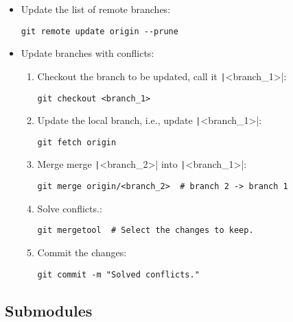 \begin{itemize}
    \item Update the list of remote branches:
    \begin{verbatim}
git remote update origin --prune
    \end{verbatim}
    \item Update branches with conflicts:
    \begin{enumerate}
        \item Checkout the branch to be updated, call it \texttt|<branch_1>|:
        \begin{verbatim}
git checkout <branch_1>
        \end{verbatim}
        \item Update the local branch, i.e., update \texttt|<branch_1>|:
        \begin{verbatim}
git fetch origin
        \end{verbatim}
        \item Merge merge \texttt|<branch_2>| into \texttt|<branch_1>|:
        \begin{verbatim}
git merge origin/<branch_2>  # branch 2 -> branch 1
        \end{verbatim}
        \item Solve conflicts.:
        \begin{verbatim}
git mergetool  # Select the changes to keep.
        \end{verbatim}
        \item Commit the changes:
        \begin{verbatim}
git commit -m "Solved conflicts."
        \end{verbatim}
    \end{enumerate}
\end{itemize}


\subsection{Submodules}

